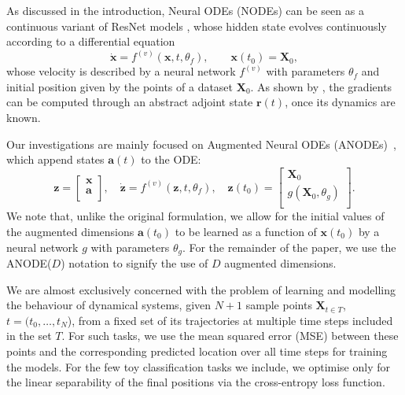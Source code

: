 \documentclass{article}
\theoremstyle{remark}
\theoremstyle{definition}
\begin{document}
As discussed in the introduction, Neural ODEs (NODEs) can be seen as a continuous variant of ResNet models \cite{he2015deep}, whose hidden state evolves continuously according to a differential equation
\begin{equation}
    \dot{\mathbf{x}} = f^{(v)}(\mathbf{x}, t, \theta_f), \qquad \mathbf{x}(t_0) = \mathbf{X}_0,
\end{equation}
whose velocity is described by a neural network $f^{(v)}$ with parameters $\theta_f$ and initial position given by the points of a dataset $\mathbf{X}_0$. As shown by \citet{chen2018neural}, the gradients can be computed through an abstract adjoint state $\mathbf{r}(t)$, once its dynamics are known.  

Our investigations are mainly focused on Augmented Neural ODEs (ANODEs)~\citep{dupont2019augmented}, which append states $\mathbf{a}(t)$ to the ODE: 
\begin{equation}
\label{eq:anode}
    \mathbf{z} = \begin{bmatrix}
           \mathbf{x} \\
           \mathbf{a} \\
         \end{bmatrix},
    \quad
    \dot{\mathbf{z}} = 
    f^{(v)}(\mathbf{z}, t, \theta_{f}),
    \quad
    \mathbf{z}(t_0)
         = \begin{bmatrix}
           \mathbf{X}_0 \\
           g(\mathbf{X}_0, \theta_{g}) \\
         \end{bmatrix}.
\end{equation}
We note that, unlike the original formulation, we allow for the initial values of the augmented dimensions $\mathbf{a}(t_0)$ to be learned as a function of $\mathbf{x}(t_0)$ by a neural network $g$ with parameters $\theta_g$. For the remainder of the paper, we use the ANODE($D$) notation to signify the use of $D$ augmented dimensions. 

We are almost exclusively concerned with the problem of learning and modelling the behaviour of dynamical systems, given $N+1$ sample points $\mathbf{X}_{t \in T}$, $t=(t_{0},\dots, t_{N}$), from a fixed set of its trajectories at multiple time steps included in the set $T$. For such tasks, we use the mean squared error (MSE) between these points and the corresponding predicted location over all time steps for training the models. For the few toy classification tasks we include, we optimise only for the linear separability of the final positions via the cross-entropy loss function.
\end{document}
